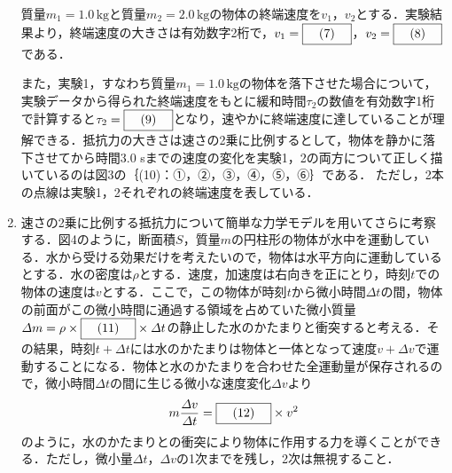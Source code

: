 \begin{enumerate}[I]
  {\hzw}質量$m_1 = 1.0 \, \text{kg}$と質量$m_2 = 2.0 \, \text{kg}$の物体の終端速度を$v_1$，$v_2$とする．実験結果より，終端速度の大きさは有効数字2桁で，$v_1 = \text{\boxnum{7}}$，$v_2 = \text{\boxnum{8}}$である．
  
  \vspace{1em}
  \vspace{1em}

  {\hzw}また，実験1，すなわち質量$m_1 = 1.0 \,\text{kg}$の物体を落下させた場合について，実験データから得られた終端速度をもとに緩和時間$\tau_2$の数値を有効数字1桁で計算すると$\tau_2 = \text{\boxnum{9}}$となり，速やかに終端速度に達していることが理解できる．抵抗力の大きさは速さの2乗に比例するとして，物体を静かに落下させてから時間3.0 sまでの速度の変化を実験1，2の両方について正しく描いているのは図3の｛(10)：①，②，③，④，⑤，⑥｝である．
  ただし，2本の点線は実験1，2それぞれの終端速度を表している．


  \item {\hzw}速さの2乗に比例する抵抗力について簡単な力学モデルを用いてさらに考察する．図4のように，断面積$S$，質量$m$の円柱形の物体が水中を運動している．水から受ける効果だけを考えたいので，物体は水平方向に運動しているとする．水の密度は$\rho$とする．速度，加速度は右向きを正にとり，時刻$t$での物体の速度は$v$とする．ここで，この物体が時刻$t$から微小時間$\varDelta t$の間，物体の前面がこの微小時間に通過する領域を占めていた微小質量$\varDelta m = \rho \times \text{\boxnum{11}} \times \varDelta t$の静止した水のかたまりと衝突すると考える．その結果，時刻$t + \varDelta t$には水のかたまりは物体と一体となって速度$v + \varDelta v$で運動することになる．物体と水のかたまりを合わせた全運動量が保存されるので，微小時間$\varDelta t$の間に生じる微小な速度変化$\varDelta v$より
  \begin{gather*}
    m\frac{\varDelta v}{\varDelta t} = \text{\boxnum{12}} \times v^2
  \end{gather*}
  のように，水のかたまりとの衝突により物体に作用する力を導くことができる．ただし，微小量$\varDelta t$，$\varDelta v$の1次までを残し，2次は無視すること．

\end{enumerate}
